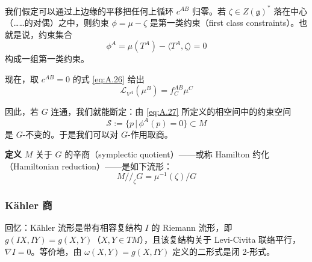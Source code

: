 我们假定可以通过上边缘的平移把任何上循环 $c^{AB}$ 归零。若 $\zeta\in Z(\mathfrak{g})^{*}$ 落在中心（……的对偶）之中，则约束 $\phi=\mu-\zeta$ 是第一类约束（first class constraints）。也就是说，约束集合
\begin{equation}
  \phi^A=\mu(T^A)-\langle T^A,\zeta\rangle=0
  \tag{A.27}
  \label{eq:A.27}
\end{equation}
构成一组第一类约束。

现在，取 $c^{AB}=0$ 的式 \eqref{eq:A.26} 给出
\begin{equation}
  \mathcal{L}_{V^A}(\mu^B)=f_C^{AB}\mu^C
  \tag{A.28}
  \label{eq:A.28}
\end{equation}

因此，若 $G$ 连通，我们就能断定：由 \eqref{eq:A.27} 所定义的相空间中的约束空间
\begin{equation}
  \mathcal{S}:=\{p\,|\,\phi^A(p)=0\}\subset M
  \tag{A.29}
  \label{eq:A.29}
\end{equation}
是 $G$-不变的。于是我们可以对 $G$-作用取商。

\textbf{定义} $M$ 关于 $G$ 的辛商（symplectic quotient）——或称 Hamilton 约化（Hamiltonian reduction）——是如下流形：
\begin{equation}
  M/\!/_{\zeta}G=\mu^{-1}(\zeta)/G
  \tag{A.30}
  \label{eq:A.30}
\end{equation}

\subsubsection{Kähler 商} %

回忆：Kähler 流形是带有相容复结构 $I$ 的 Riemann 流形，即 $g(IX,IY)=g(X,Y)$（$X,Y\in TM$），且该复结构关于 Levi-Civita 联络平行，$\nabla I=0$。等价地，由 $\omega(X,Y)=g(X,IY)$ 定义的二形式是闭 2-形式。

